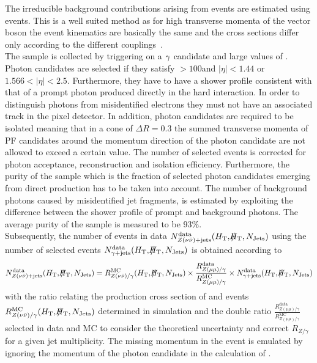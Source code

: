 The irreducible background contributions arising from \ZInvJets events are estimated using \photonJets events. This is a well suited method as for high transverse momenta of the vector boson the event kinematics are basically the same and the cross sections differ only according to the different couplings~\cite{Ask:2011xf, Bern:2012vx}. \\
The \photonJets sample is collected by triggering on a $\gamma$ candidate and large values of \HT. Photon candidates are selected if they satisfy \pt$ > 100$\gev and $|\eta| < 1.44$ or $1.566 < |\eta| < 2.5$. Furthermore, they have to have a shower profile consistent with that of a prompt photon produced directly in the hard interaction. In order to distinguish photons from misidentified electrons they must not have an associated track in the pixel detector. In addition, photon candidates are required to be isolated meaning that in a cone of $\Delta R = 0.3$ the summed transverse momenta of PF candidates around the momentum direction of the photon candidate are not allowed to exceed a certain value. The number of selected \photonJets events is corrected for photon acceptance, reconstruction and isolation efficiency. Furthermore, the purity of the \photonJets sample which is the fraction of selected photon candidates emerging from direct production has to be taken into account. The number of background photons caused \eg by misidentified jet fragments, is estimated by exploiting the difference between the shower profile of prompt and background photons. The average purity of the \photonJets sample is measured to be 93\%.\\
Subsequently, the number of \ZInvJets events in data $N_{Z(\nu\bar{\nu})+\text{jets}}^{\text{data}} (H_{\text{T}}, \slash\mkern-12mu{H}_{\text{T}}, N_{\text{Jets}})$ using the number of selected \photonJets events $N_{\gamma+\text{jets}}^{\text{data}} (H_{\text{T}},\slash\mkern-12mu{H}_{\text{T}},N_{\text{Jets}})$ is obtained according to
\begin{equation*}
N_{\ZInvJets}^{\text{data}} (\HT, \MHT, \NJets) = R^{\text{MC}}_{Z(\nu\bar{\nu})/\gamma} (\HT,\MHT,\NJets)
                                                        \times 
                                                       \frac{R_{Z(\mu\mu)/\gamma}^{\text{data}}}{R_{Z(\mu\mu)/\gamma}^{\text{MC}}}
                                                        \times 
                                                       N_{\photonJets}^{\text{data}} (\HT,\MHT,\NJets)
\label{eqn:photoncorr}
\end{equation*}
with the ratio relating the production cross section of \ZInvJets and \photonJets events $R^{\text{MC}}_{Z(\nu\bar{\nu})/\gamma} (H_{\text{T}},\slash\mkern-12mu{H}_{\text{T}},N_{\text{Jets}})$ determined in simulation and the double ratio $\frac{R_{Z(\mu\mu)/\gamma}^{\text{data}}}{R_{Z(\mu\mu)/\gamma}^{\text{MC}}}$ selected in data and MC to consider the theoretical uncertainty and correct $R_{Z/\gamma}$ for a given jet multiplicity. The missing momentum in the event is emulated by ignoring the momentum of the photon candidate in the calculation of \MHT. \\
